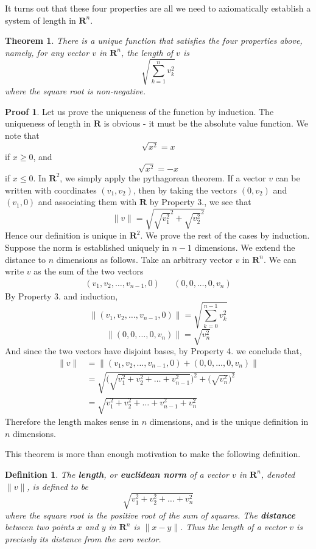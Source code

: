 \documentclass[12pt]{amsbook}
\theoremstyle{plain}
\newtheorem{definition}{Definition}
\newtheorem{theorem}{Theorem}
\theoremstyle{definition}
\newtheorem*{prf}{Proof}
\begin{document}
It turns out that these four properties are all we need to axiomatically establish a system of length in $\mathbf{R}^n$.

\begin{theorem}
  There is a unique function that satisfies the four properties above, namely, for any vector $v$ in $\mathbf{R}^n$, the length of $v$ is
  \[ \sqrt{\sum_{k = 1}^n v_k^2} \]
  where the square root is non-negative.
\end{theorem}
\begin{prf}
  Let us prove the uniqueness of the function by induction. The uniqueness of length in $\mathbf{R}$ is obvious - it must be the absolute value function. We note that
  \[ \sqrt{x^2} = x \]
  if $x \geq 0$, and
  \[ \sqrt{x^2} = -x \]
  if $x \leq 0$. In $\mathbf{R}^2$, we simply apply the pythagorean theorem. If a vector $v$ can be written with coordinates $(v_1, v_2)$, then by taking the vectors $(0,v_2)$ and $(v_1,0)$ and associating them with $\mathbf{R}$ by Property 3., we see that
  \[ \|v\| = \sqrt{\sqrt{v_1^2}^2 + \sqrt{v_2^2}^2} \]
  Hence our definition is unique in $\mathbf{R}^2$. We prove the rest of the cases by induction. Suppose the norm is established uniquely in $n-1$ dimensions. We extend the distance to $n$ dimensions as follows. Take an arbitrary vector $v$ in $\mathbf{R}^n$. We can write $v$ as the sum of the two vectors
  \begin{align*}
    (v_1, v_2,\dots, v_{n-1}, 0) && (0, 0, \dots, 0, v_n)
  \end{align*}
  By Property 3. and induction,
  \[ \|(v_1, v_2, \dots, v_{n-1}, 0)\| = \sqrt{ \sum_{k = 0}^{n-1} v_k^2 } \]
  \[ \|(0,0,\dots,0,v_n)\| = \sqrt{v_n^2} \]
  And since the two vectors have disjoint bases, by Property 4. we conclude that,
  \begin{align*}
    \|v\| &= \| (v_1, v_2, \dots, v_{n-1}, 0) + (0,0,\dots,0,v_n) \|\\
      &= \sqrt{\bigg(\sqrt{v_1^2 + v_2^2 + \dots + v_{n-1}^2}\bigg)^2 + \bigg(\sqrt{v_n^2}\bigg)^2}\\
      &= \sqrt{v_1^2 + v_2^2 + \dots + v_{n-1}^2 + v_n^2}
  \end{align*}
  Therefore the length makes sense in $n$ dimensions, and is the unique definition in $n$ dimensions.
\end{prf}

This theorem is more than enough motivation to make the following definition.

\begin{definition}
  The {\bf length}, or {\bf euclidean norm} of a vector $v$ in $\mathbf{R}^n$, denoted $\|v\|$, is defined to be
  \[ \sqrt{v_1^2 + v_2^2 + \dots + v_n^2} \]
  where the square root is the positive root of the sum of squares. The {\bf distance} between two points $x$ and $y$ in $\mathbf{R}^n$ is $\| x - y \|$. Thus the length of a vector $v$ is precisely its distance from the zero vector.
\end{definition}
\end{document}
